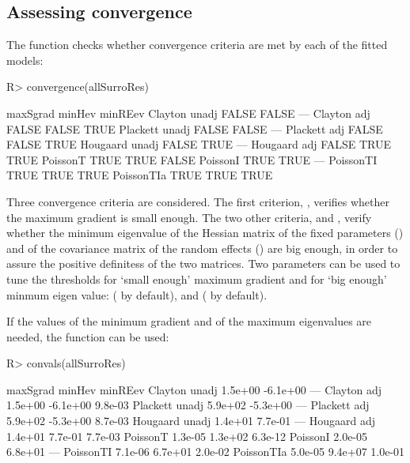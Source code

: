 \documentclass[article,shortnames, nojss]{jss}\usepackage[]{graphicx}\usepackage[]{color}
\begin{document}
\subsection{Assessing convergence}
The function  checks whether convergence criteria
  are met by each of the fitted models:
\begin{Schunk}
\begin{Sinput}
R>   convergence(allSurroRes)
\end{Sinput}
\begin{Soutput}
               maxSgrad minHev minREev
Clayton unadj     FALSE  FALSE     ---
Clayton adj       FALSE  FALSE    TRUE
Plackett unadj    FALSE  FALSE     ---
Plackett adj      FALSE  FALSE    TRUE
Hougaard unadj    FALSE   TRUE     ---
Hougaard adj      FALSE   TRUE    TRUE
PoissonT           TRUE   TRUE   FALSE
PoissonI           TRUE   TRUE     ---
PoissonTI          TRUE   TRUE    TRUE
PoissonTIa         TRUE   TRUE    TRUE
\end{Soutput}
\end{Schunk}
Three convergence criteria are considered.
The first criterion, ,
  verifies whether the maximum gradient is small enough.
The two other criteria,  and ,
  verify whether the minimum eigenvalue
  of the Hessian matrix of the fixed parameters ()
  and of the covariance matrix of the random effects ()
  are big enough,
  in order to assure the positive definitess of the two matrices.
Two parameters can be used to tune the thresholds
  for `small enough' maximum gradient and 
  for `big enough' minmum eigen value:
   ( by default),
  and  ( by default).

If the values of the minimum gradient and of the maximum eigenvalues are needed,
  the function  can be used:
\begin{Schunk}
\begin{Sinput}
R>   convals(allSurroRes)
\end{Sinput}
\begin{Soutput}
               maxSgrad   minHev minREev
Clayton unadj   1.5e+00 -6.1e+00     ---
Clayton adj     1.5e+00 -6.1e+00 9.8e-03
Plackett unadj  5.9e+02 -5.3e+00     ---
Plackett adj    5.9e+02 -5.3e+00 8.7e-03
Hougaard unadj  1.4e+01  7.7e-01     ---
Hougaard adj    1.4e+01  7.7e-01 7.7e-03
PoissonT        1.3e-05  1.3e+02 6.3e-12
PoissonI        2.0e-05  6.8e+01     ---
PoissonTI       7.1e-06  6.7e+01 2.0e-02
PoissonTIa      5.0e-05  9.4e+07 1.0e-01
\end{Soutput}
\end{Schunk}
\end{document}
